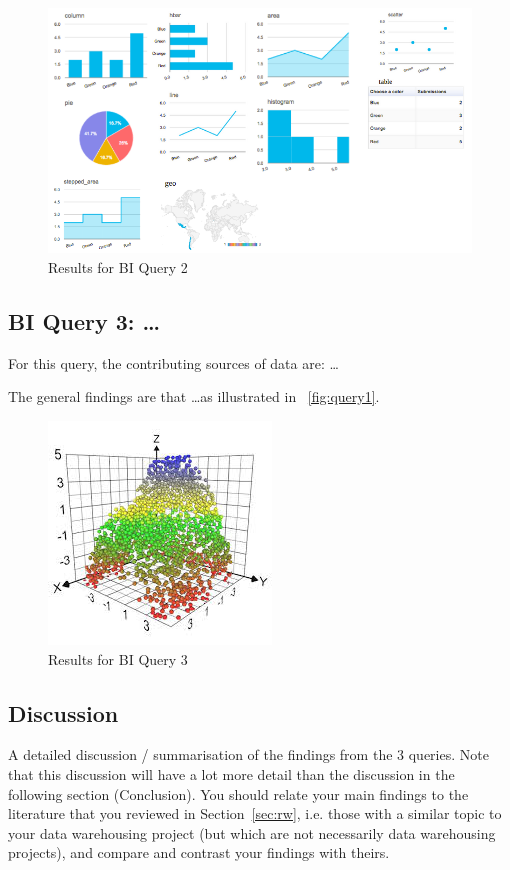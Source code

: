 \begin{figure}[ht]
\centering
\includegraphics[width=.75\textwidth]{./figures/dashboard}
\caption{Results for BI Query 2}
\label{fig:query2}
\end{figure}

\subsection{BI Query 3: \ldots}
\label{sec:BIThree}

For this query, the contributing sources of data are: \ldots

The general findings are that \ldots as illustrated in \figurename~\ref{fig:query1}.

\begin{figure}[ht]
\centering
\includegraphics[width=.5\textwidth]{./figures/query3}
\caption{Results for BI Query 3}
\label{fig:query3}
\end{figure}

\subsection{Discussion}
\label{sec:discussion}

A detailed discussion / summarisation of the findings from the 3 queries. Note that this discussion will have a lot more detail than the discussion in the following section (Conclusion). You should relate your main findings to the literature that you reviewed in Section~\ref{sec:rw}, i.e. those with a similar topic to your data warehousing project (but which are not necessarily data warehousing projects), and compare and contrast your findings with theirs. 